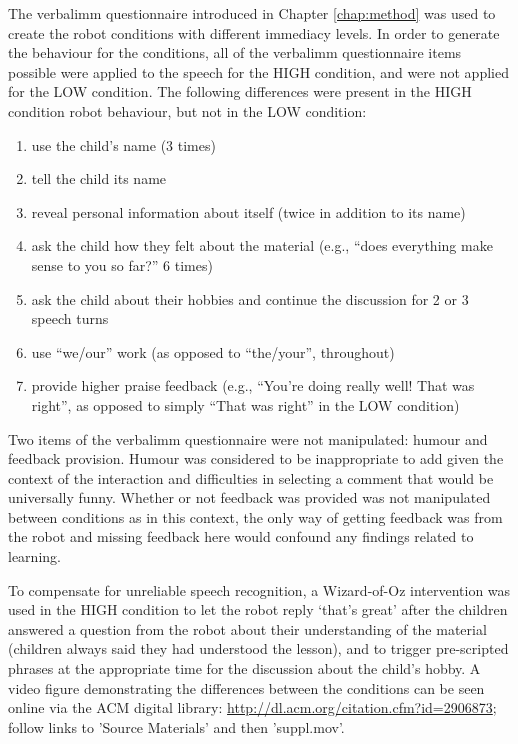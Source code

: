 The \gls{verbalimm} questionnaire \citep{gorham1988relationship} introduced in Chapter \ref{chap:method} was used to create the robot conditions with different immediacy levels. In order to generate the behaviour for the conditions, all of the \gls{verbalimm} questionnaire items possible were applied to the speech for the HIGH condition, and were not applied for the LOW condition. The following differences were present in the HIGH condition robot behaviour, but not in the LOW condition:
\begin{enumerate}
\item use the child's name (3 times)
\item tell the child its name
\item reveal personal information about itself (twice in addition to its name)
\item ask the child how they felt about the material (e.g., ``does everything make sense to you so far?'' 6 times)
\item ask the child about their hobbies and continue the discussion for 2 or 3 speech turns
\item use ``we/our'' work (as opposed to ``the/your'', throughout)
\item provide higher praise feedback (e.g., ``You're doing really well! That was right'', as opposed to simply ``That was right'' in the LOW condition)
\end{enumerate}

Two items of the \gls{verbalimm} questionnaire were not manipulated: humour and feedback provision. Humour was considered to be inappropriate to add given the context of the interaction and difficulties in selecting a comment that would be universally funny. Whether or not feedback was provided was not manipulated between conditions as in this context, the only way of getting feedback was from the robot and missing feedback here would confound any findings related to \gls{learning}.

To compensate for unreliable speech recognition, a Wizard-of-Oz intervention was used in the HIGH condition to let the robot reply `that's great' after the children answered a question from the robot about their understanding of the material (children always said they had understood the lesson), and to trigger pre-scripted phrases at the appropriate time for the discussion about the child's hobby. A video figure demonstrating the differences between the conditions can be seen online via the ACM digital library: \url{http://dl.acm.org/citation.cfm?id=2906873}; follow links to 'Source Materials' and then 'suppl.mov'.


